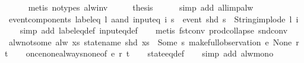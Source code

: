 \begin{isabellebody}
\ \ \ \ \isamarkupfalse%
\ {\isacharparenleft}metis\ {\isacharparenleft}no{\isacharunderscore}types{\isacharparenright}\ alw{\isacharunderscore}inv{\isacharparenright}\isanewline
\ \ \isamarkupfalse%
\ \isamarkupfalse%
\ {\isacharquery}thesis\isanewline
\ \ \ \ \isamarkupfalse%
\ {\isacharparenleft}simp\ add{\isacharcolon}\ all{\isacharunderscore}imp{\isacharunderscore}alw{\isacharparenright}\isanewline
{}\isamarkupfalse%
%
\endisatagproof
{\isafoldproof}%
%
\isadelimproof
\isanewline
%
\endisadelimproof
\isanewline
{}\isamarkupfalse%
\ event{\isacharunderscore}components{\isacharcolon}\ {\isachardoublequoteopen}{\isacharparenleft}label{\isacharunderscore}eq\ l\ aand\ input{\isacharunderscore}eq\ i{\isacharparenright}\ s\ {\isacharequal}\ {\isacharparenleft}event\ {\isacharparenleft}shd\ s{\isacharparenright}\ {\isacharequal}\ {\isacharparenleft}String{\isachardot}implode\ l{\isacharcomma}\ i{\isacharparenright}{\isacharparenright}{\isachardoublequoteclose}\isanewline
%
\isadelimproof
\ \ %
\endisadelimproof
%
\isatagproof
{}\isamarkupfalse%
\ {\isacharparenleft}simp\ add{\isacharcolon}\ label{\isacharunderscore}eq{\isacharunderscore}def\ input{\isacharunderscore}eq{\isacharunderscore}def{\isacharparenright}\isanewline
\ \ \isamarkupfalse%
\ {\isacharparenleft}metis\ fst{\isacharunderscore}conv\ prod{\isachardot}collapse\ snd{\isacharunderscore}conv{\isacharparenright}%
\endisatagproof
{\isafoldproof}%
%
\isadelimproof
\isanewline
%
\endisadelimproof
\isanewline
{}\isamarkupfalse%
\ alw{\isacharunderscore}not{\isacharunderscore}some{\isacharcolon}\ {\isachardoublequoteopen}alw\ {\isacharparenleft}{\isasymlambda}xs{\isachardot}\ statename\ {\isacharparenleft}shd\ xs{\isacharparenright}\ {\isasymnoteq}\ Some\ s{\isacharparenright}\ {\isacharparenleft}make{\isacharunderscore}full{\isacharunderscore}observation\ e\ None\ r\ t{\isacharparenright}{\isachardoublequoteclose}\isanewline
%
\isadelimproof
\ \ %
\endisadelimproof
%
\isatagproof
{}\isamarkupfalse%
\ once{\isacharunderscore}none{\isacharunderscore}always{\isacharunderscore}none{\isacharbrackleft}of\ e\ r\ t{\isacharbrackright}\isanewline
\ \ \isamarkupfalse%
\ state{\isacharunderscore}eq{\isacharunderscore}def\isanewline
\ \ \isamarkupfalse%
\ {\isacharparenleft}simp\ add{\isacharcolon}\ alw{\isacharunderscore}mono{\isacharparenright}%
\endisatagproof
{\isafoldproof}%
%
\isadelimproof
\isanewline
%
\endisadelimproof

\end{isabellebody}
